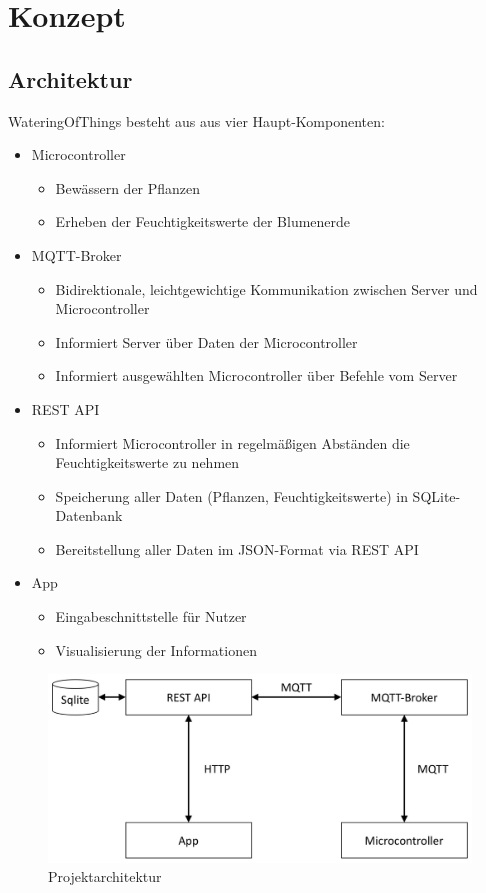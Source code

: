 \section{Konzept}
    \subsection{Architektur}
    WateringOfThings besteht aus aus vier Haupt-Komponenten: 
   \begin{itemize}
       \item Microcontroller
           \begin{itemize}
               \item Bewässern der Pflanzen
               \item Erheben der Feuchtigkeitswerte der Blumenerde
           \end{itemize}
       \item MQTT-Broker
           \begin{itemize}
               \item Bidirektionale, leichtgewichtige Kommunikation zwischen Server und Microcontroller
               \item Informiert Server über Daten der Microcontroller
               \item Informiert ausgewählten Microcontroller über Befehle vom Server
           \end{itemize}
       \item REST API
           \begin{itemize}
               \item Informiert Microcontroller in regelmäßigen Abständen die Feuchtigkeitswerte zu nehmen
               \item Speicherung aller Daten (Pflanzen, Feuchtigkeitswerte) in SQLite-Datenbank
               \item Bereitstellung aller Daten im JSON-Format via REST API
           \end{itemize}
    \item App
        \begin{itemize}
            \item Eingabeschnittstelle für Nutzer
            \item Visualisierung der Informationen
        \end{itemize}
   \end{itemize}
    \begin{figure}[H]
        \centering
        \includegraphics[width=0.7\linewidth]{../Pictures/Konzept/Architecture}
        \caption{Projektarchitektur}
        \label{fig:architecture}
    \end{figure}
    
